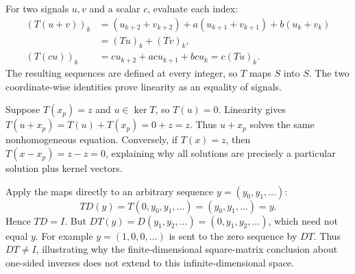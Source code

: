 For two signals $u,v$ and a scalar $c$, evaluate each index:
\begin{align*}
 (T(u+v))_k
 &=(u_{k+2}+v_{k+2})+a(u_{k+1}+v_{k+1})+b(u_k+v_k)\\
 &=(Tu)_k+(Tv)_k,\\
 (T(cu))_k&=cu_{k+2}+ac u_{k+1}+bc u_k=c(Tu)_k.
\end{align*}
The resulting sequences are defined at every integer, so $T$ maps $S$ into
$S$. The two coordinate-wise identities prove linearity as an equality of signals.

Suppose $T(x_p)=z$ and $u\in\ker T$, so $T(u)=0$.
Linearity gives $T(u+x_p)=T(u)+T(x_p)=0+z=z$.
Thus $u+x_p$ solves the same nonhomogeneous equation.
Conversely, if $T(x)=z$, then $T(x-x_p)=z-z=0$, explaining why all
solutions are precisely a particular solution plus kernel vectors.

Apply the maps directly to an arbitrary sequence $y=(y_0,y_1,\ldots)$:
\[
 TD(y)=T(0,y_0,y_1,\ldots)=(y_0,y_1,\ldots)=y.
\]
Hence $TD=I$. But
$DT(y)=D(y_1,y_2,\ldots)=(0,y_1,y_2,\ldots)$, which need not equal $y$.
For example $y=(1,0,0,\ldots)$ is sent to the zero sequence by $DT$.
Thus $DT\ne I$, illustrating why the finite-dimensional square-matrix
conclusion about one-sided inverses does not extend to this infinite-dimensional space.
